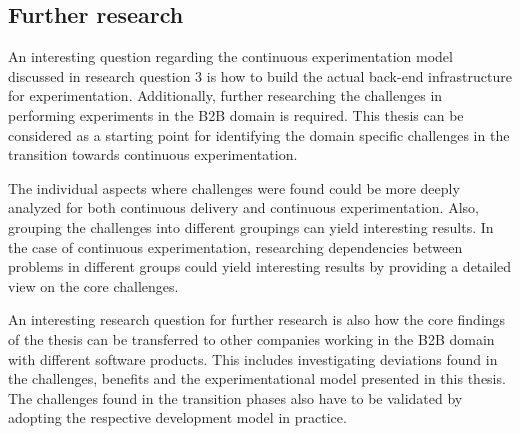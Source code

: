\documentclass[english, grading]{tktltiki2}
\theoremstyle{definition}
\theoremstyle{remark}
\begin{document}
\subsection{Further research}
An interesting question regarding the continuous experimentation model discussed in research question 3 is how to build the actual back-end infrastructure for experimentation. Additionally, further researching the challenges in performing experiments in the B2B domain is required. This thesis can be considered as a starting point for identifying the domain specific challenges in the transition towards continuous experimentation.

The individual aspects where challenges were found could be more deeply analyzed for both continuous delivery and continuous experimentation. Also, grouping the challenges into different groupings can yield interesting results. In the case of continuous experimentation, researching dependencies between problems in different groups could yield interesting results by providing a detailed view on the core challenges.

An interesting research question for further research is also how the core findings of the thesis can be transferred to other companies working in the B2B domain with different software products. This includes investigating deviations found in the challenges, benefits and the experimentational model presented in this thesis. The challenges found in the transition phases also have to be validated by adopting the respective development model in practice. 









\end{document}
